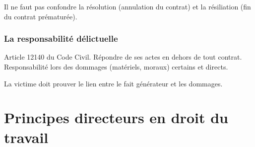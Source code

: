 \documentclass[10pt,a4paper]{article}
\begin{document}
Il ne faut pas confondre la résolution (annulation du contrat) et la résiliation (fin du contrat prématurée).

\section{La responsabilité délictuelle}

Article 12140 du Code Civil. Répondre de ses actes en dehors de tout contrat. Responsabilité lors des dommages (matériels, moraux) certains et directs.

La victime doit prouver le lien entre le fait générateur et les dommages.

\part{Principes directeurs en droit du travail}
\end{document}
